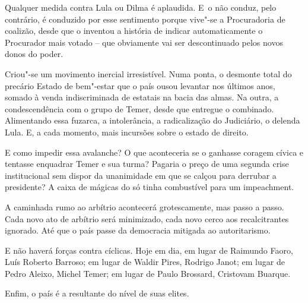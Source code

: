 Qualquer medida contra Lula ou Dilma é aplaudida. E~o  não conduz,
pelo contrário, é conduzido por esse sentimento porque vive"-se a
Procuradoria de coalizão, desde que o  inventou a história de indicar
automaticamente o Procurador mais votado -- que obviamente vai ser
descontinuado pelos novos donos do poder.

Criou"-se um movimento inercial irresistível. Numa ponta, o desmonte
total do precário Estado de bem"-estar que o país ousou levantar nos
últimos anos, somado à venda indiscriminada de estatais na bacia das
almas. Na outra, a condescendência com o grupo de Temer, desde que
entregue o combinado. Alimentando essa fuzarca, a intolerância, a
radicalização do Judiciário, o delenda Lula. E, a cada momento, mais
incursões sobre o estado de direito.

E como impedir essa avalanche? O que aconteceria se o  ganhasse
coragem cívica e tentasse enquadrar Temer e sua turma? Pagaria o preço
de uma segunda crise institucional sem dispor da unanimidade em que se
calçou para derrubar a presidente? A caixa de mágicas do  só tinha
combustível para um impeachment.

A caminhada rumo ao arbítrio acontecerá grotescamente, mas passo a
passo. Cada novo ato de arbítrio será minimizado, cada novo cerco aos
recalcitrantes ignorado. Até que o país passe da democracia mitigada ao
autoritarismo.

E não haverá forças contra cíclicas. Hoje em dia, em lugar de Raimundo
Faoro, Luís Roberto Barroso; em lugar de Waldir Pires, Rodrigo Janot; em
lugar de Pedro Aleixo, Michel Temer; em lugar de Paulo Brossard,
Cristovam Buarque.

Enfim, o país é a resultante do nível de suas elites.
